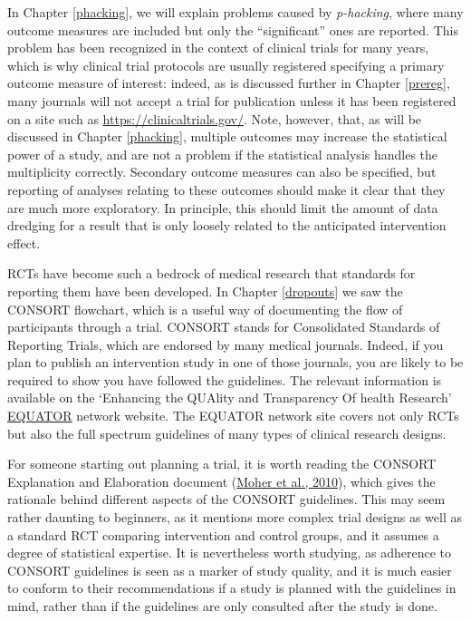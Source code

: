 \documentclass{krantz}
\begin{document}
In Chapter \ref{phacking}, we will explain problems caused by \emph{p-hacking}, where many outcome measures are included but only the ``significant'' ones are reported. This problem has been recognized in the context of clinical trials for many years, which is why clinical trial protocols are usually registered specifying a primary outcome measure of interest: indeed, as is discussed further in Chapter \ref{prereg}, many journals will not accept a trial for publication unless it has been registered on a site such as \url{https://clinicaltrials.gov/}. Note, however, that, as will be discussed in Chapter \ref{phacking}, multiple outcomes may increase the statistical power of a study, and are not a problem if the statistical analysis handles the multiplicity correctly. Secondary outcome measures can also be specified, but reporting of analyses relating to these outcomes should make it clear that they are much more exploratory. In principle, this should limit the amount of data dredging for a result that is only loosely related to the anticipated intervention effect.

RCTs have become such a bedrock of medical research that standards for reporting them have been developed. In Chapter \ref{dropouts} we saw the CONSORT flowchart, which is a useful way of documenting the flow of participants through a trial. CONSORT stands for Consolidated Standards of Reporting Trials, which are endorsed by many medical journals. Indeed, if you plan to publish an intervention study in one of those journals, you are likely to be required to show you have followed the guidelines. The relevant information is available on the `Enhancing the QUAlity and Transparency Of health Research' \href{http://www.equator-network.org}{EQUATOR} network website. The EQUATOR network site covers not only RCTs but also the full spectrum guidelines of many types of clinical research designs.

For someone starting out planning a trial, it is worth reading the CONSORT Explanation and Elaboration document (\protect\hyperlink{ref-moher2010}{Moher et al., 2010}), which gives the rationale behind different aspects of the CONSORT guidelines. This may seem rather daunting to beginners, as it mentions more complex trial designs as well as a standard RCT comparing intervention and control groups, and it assumes a degree of statistical expertise. It is nevertheless worth studying, as adherence to CONSORT guidelines is seen as a marker of study quality, and it is much easier to conform to their recommendations if a study is planned with the guidelines in mind, rather than if the guidelines are only consulted after the study is done.
\end{document}

